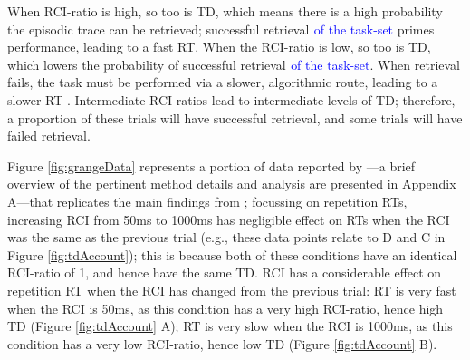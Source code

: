 \documentclass[a4paper, man, natbib]{apa6}
\newcommand{\jg}[1]{\textcolor{blue}{$^{\textrm{}}${#1}}}
\begin{document}
When RCI-ratio is high, so too is TD, which means there is a high probability the episodic trace can be retrieved; successful retrieval \jg{of the task-set} primes performance, leading to a fast RT. When the RCI-ratio is low, so too is TD, which lowers the probability of successful retrieval \jg{of the task-set}. When retrieval fails, the task must be performed via a slower, algorithmic route, leading to a slower RT \citep[see][for a similar proposal]{Logan2002}. Intermediate RCI-ratios lead to intermediate levels of TD; therefore, a proportion of these trials will have successful retrieval, and some trials will have failed retrieval. 

Figure \ref{fig:grangeData} represents a portion of data reported by \cite{Grangeinrevision}---a brief overview of the pertinent method details and analysis are presented in Appendix A---that replicates the main findings from \cite{Horoufchin2011a}; focussing on repetition RTs, increasing RCI from 50ms to 1000ms has negligible effect on RTs when the RCI was the same as the previous trial (e.g., these data points relate to D and C in Figure \ref{fig:tdAccount}); this is because both of these conditions have an identical RCI-ratio of 1, and hence have the same TD. RCI has a considerable effect on repetition RT when the RCI has changed from the previous trial: RT is very fast when the RCI is 50ms, as this condition has a very high RCI-ratio, hence high TD (Figure \ref{fig:tdAccount} A); RT is very slow when the RCI is 1000ms, as this condition has a very low RCI-ratio, hence low TD (Figure \ref{fig:tdAccount} B). 
\end{document}
